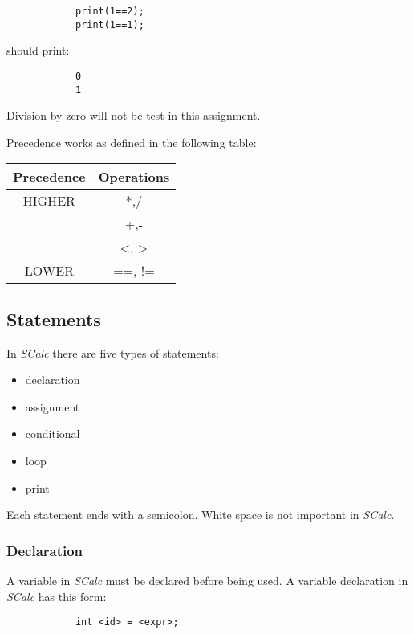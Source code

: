 \documentclass{article}
\begin{document}
		\begin{lstlisting}
			print(1==2);
			print(1==1);
		\end{lstlisting}

		should print:

		\begin{lstlisting}
			0
			1
		\end{lstlisting}

		Division by zero will not be test in this assignment.

		Precedence works as defined in the following table:

		\begin{center}
			\begin{tabular}{|c|c|}
			\hline
			\textbf{Precedence} & \textbf{Operations} \\
			\hline
			HIGHER
			& *,/ \\
			& +,- \\
			& <, > \\
			LOWER & ==, != \\
			\hline
			\end{tabular}
		\end{center}


	\subsection {Statements}

		In \textit{SCalc} there are five types of statements:

		\begin {itemize}
			\item{declaration}
			\item{assignment}
			\item{conditional}
			\item{loop}
			\item{print}
		\end {itemize}

		Each statement ends with a semicolon.  White space is not important in \textit{SCalc}.


	\subsubsection{Declaration}

		A variable in \textit{SCalc} must be declared before being used. A variable declaration in \textit{SCalc} has
		this form:

		\begin{lstlisting}
			int <id> = <expr>;
		\end{lstlisting}
\end{document}
